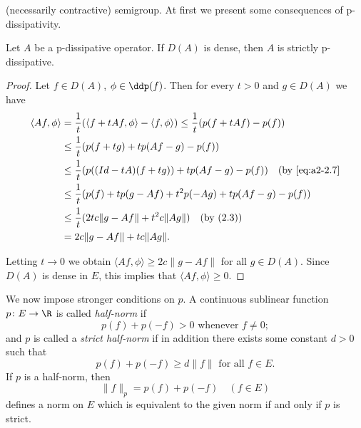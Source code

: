 (necessarily contractive) semigroup.
At first we present some consequences of p-dissipativity.
\begin{theorem}\label{thm:a2-2.7}
Let $A$ be a p-dissipative operator.
If $D(A)$ is dense, then $A$ is strictly p-dissipative.
\end{theorem}
\begin{proof}
Let $f \in D(A)$, $\phi \in \ddp(f)$.
Then for every $t > 0$ and $g \in D(A)$ we have
\begin{align*}
\langle Af,\phi \rangle 
&= \frac{1}{t}(\langle f + tAf,\phi \rangle - \langle f,\phi \rangle) \leq \frac{1}{t}(p(f + tAf) - p(f)) \\
&\leq \frac{1}{t}(p(f + tg) + tp(Af - g) - p(f)) \\
&\leq \frac{1}{t}(p((Id - tA)(f + tg)) + tp(Af - g) - p(f)) \quad \text{(by \eqref{eq:a2-2.7}} \\ %
&\leq \frac{1}{t}(p(f) + tp(g - Af) + t^2p(-Ag) + tp(Af - g) - p(f)) \\
&\leq \frac{1}{t}(2tc\|g - Af\| + t^2c\|Ag\|) \quad \text{(by (2.3))} \\
&= 2c\|g - Af\| + tc\|Ag\|.
\end{align*}

Letting $t \to 0$ we obtain $\langle Af,\phi \rangle \geq 2c\|g - Af\|$ for all $g \in D(A)$.
Since $D(A)$ is dense in $E$, this implies that $\langle Af,\phi \rangle \geq 0$.
\end{proof}

We now impose stronger conditions on $p$.
A continuous sublinear function $p \colon E \to \R$ is called \emph{half-norm} if
\begin{equation}\label{eq:a2-2.11}
p(f) + p(-f) > 0 \text{ whenever } f \neq 0;
\end{equation}
and $p$ is called a \emph{strict half-norm} if in addition there exists some constant $d > 0$ such that
\begin{equation}\label{eq:a2-2.12}
p(f) + p(-f) \geq d\|f\| \text{ for all } f \in E.
\end{equation}
If $p$ is a half-norm, then
\begin{equation}\label{eq:a2-2.13}
\|f\|_p = p(f) + p(-f) \quad (f \in E)
\end{equation}
defines a norm on $E$ which is equivalent to the given norm if and only if $p$ is strict.

